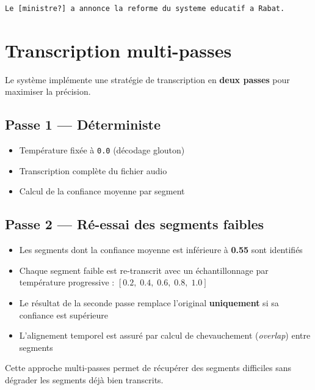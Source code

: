 \documentclass[12pt,a4paper]{report}
\begin{document}
\begin{lstlisting}[title=Exemple de sortie avec marquage de confiance]
Le [ministre?] a annonce la reforme du systeme educatif a Rabat.
\end{lstlisting}

\section{Transcription multi-passes}

Le système implémente une stratégie de transcription en \textbf{deux passes} pour maximiser la précision.

\subsection{Passe 1 — Déterministe}

\begin{itemize}
    \item Température fixée à \texttt{0.0} (décodage glouton)
    \item Transcription complète du fichier audio
    \item Calcul de la confiance moyenne par segment
\end{itemize}

\subsection{Passe 2 — Ré-essai des segments faibles}

\begin{itemize}
    \item Les segments dont la confiance moyenne est inférieure à \textbf{0.55} sont identifiés
    \item Chaque segment faible est re-transcrit avec un échantillonnage par température progressive : $[0.2,\; 0.4,\; 0.6,\; 0.8,\; 1.0]$
    \item Le résultat de la seconde passe remplace l'original \textbf{uniquement} si sa confiance est supérieure
    \item L'alignement temporel est assuré par calcul de chevauchement (\textit{overlap}) entre segments
\end{itemize}

Cette approche multi-passes permet de récupérer des segments difficiles sans dégrader les segments déjà bien transcrits.

\end{document}

